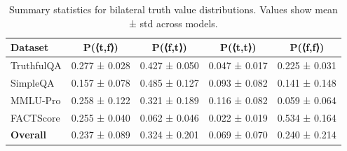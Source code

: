 






\begin{table}[htbp]
\centering
\caption{Summary statistics for bilateral truth value distributions. Values show mean ± std across models.}
\begin{tabular}{lcccc}
\toprule
\textbf{Dataset} & \textbf{P(⟨t,f⟩)} & \textbf{P(⟨f,t⟩)} & \textbf{P(⟨t,t⟩)} & \textbf{P(⟨f,f⟩)} \\
\midrule
TruthfulQA & 0.277 ± 0.028 & 0.427 ± 0.050 & 0.047 ± 0.017 & 0.225 ± 0.031 \\
SimpleQA & 0.157 ± 0.078 & 0.485 ± 0.127 & 0.093 ± 0.082 & 0.141 ± 0.148 \\
MMLU-Pro & 0.258 ± 0.122 & 0.321 ± 0.189 & 0.116 ± 0.082 & 0.059 ± 0.064 \\
FACTScore & 0.255 ± 0.040 & 0.062 ± 0.046 & 0.022 ± 0.019 & 0.534 ± 0.164 \\
\midrule
\textbf{Overall} & 0.237 ± 0.089 & 0.324 ± 0.201 & 0.069 ± 0.070 & 0.240 ± 0.214 \\
\bottomrule
\end{tabular}
\end{table}
